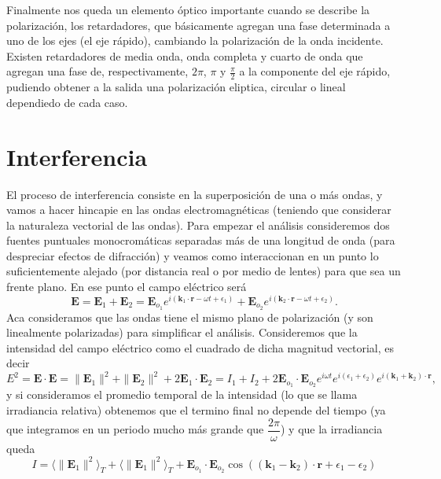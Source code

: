 \documentclass[a4paper]{article}
\numberwithin{equation}{section}
\begin{document}
	Finalmente nos queda un elemento óptico importante cuando se describe la polarización, los retardadores, que básicamente agregan una fase determinada a uno de los ejes (el eje rápido), cambiando la polarización de la onda incidente. Existen retardadores de media onda, onda completa y cuarto de onda que agregan una fase de, respectivamente, $2\pi$, $\pi$ y $\frac{\pi}{2}$ a la componente del eje rápido, pudiendo obtener a la salida una polarización eliptica, circular o lineal dependiedo de cada caso.
	
\section{Interferencia}
	\label{sec:interferencia}
	El proceso de interferencia consiste en la superposición de una o más ondas, y vamos a hacer hincapie en las ondas electromagnéticas (teniendo que considerar la naturaleza vectorial de las ondas). Para empezar el análisis consideremos dos fuentes puntuales monocromáticas separadas más de una longitud de onda (para despreciar efectos de difracción) y veamos como interaccionan en un punto lo suficientemente alejado (por distancia real o por medio de lentes) para que sea un frente plano. En ese punto el campo eléctrico será \[\textbf{E} = \textbf{E}_{1} + \textbf{E}_2 = \textbf{E}_{o_1} e^{i (\textbf{k}_1 \cdot \textbf{r} - \omega t + \epsilon_1)} + \textbf{E}_{o_2} e^{i (\textbf{k}_2 \cdot \textbf{r} - \omega t + \epsilon_2)}.\] Aca consideramos que las ondas tiene el mismo plano de polarización (y son linealmente polarizadas) para simplificar el análisis. Consideremos que la intensidad del campo eléctrico como el cuadrado de dicha magnitud vectorial, es decir \[E^2 = \textbf{E} \cdot \textbf{E} = \|\textbf{E}_1\|^2 + \|\textbf{E}_2\|^2 + 2 \textbf{E}_1 \cdot \textbf{E}_2 = I_1 + I_2 + 2 \textbf{E}_{o_1} \cdot \textbf{E}_{o_2} e^{i \omega t} e^{ i (\epsilon_1 + \epsilon_2)} e^{i (\textbf{k}_1 + \textbf{k}_2) \cdot \textbf{r}},\] y si consideramos el promedio temporal de la intensidad (lo que se llama irradiancia relativa) obtenemos que el termino final no depende del tiempo (ya que integramos en un periodo mucho más grande que $\dfrac{2\pi}{\omega}$) y que la irradiancia queda 
	\begin{equation}
		I = \langle\|\textbf{E}_1\|^2\rangle_T + \langle\|\textbf{E}_1\|^2\rangle_T + \textbf{E}_{o_1} \cdot \textbf{E}_{o_2} \cos((\textbf{k}_1 - \textbf{k}_2)\cdot \textbf{r} + \epsilon_1 - \epsilon_2)
		\label{eq:interferencia_general}
	\end{equation}
\end{document}
